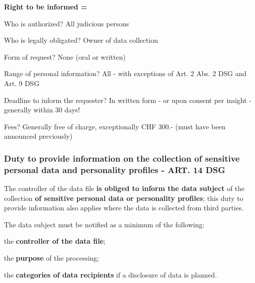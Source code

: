 \textbf{Right to be informed =} 
\begin{compactitem}
	\item Who is authorized? All judicious persons
	\item Who is legally obligated? Owner of data collection
	\item Form of request? None (oral or written)
	\item Range of personal information? All - with exceptions of Art. 2 Abs. 2 DSG and Art. 9 DSG
	\item Deadline to inform the requester? In written form - or upon consent per insight - generally within 30 days!
	\item Fees? Generally free of charge, exceptionally CHF 300.- (must have been announced previously)
\end{compactitem}

\subsubsection{Duty to provide information on the collection of sensitive personal data and personality profiles - ART. 14 DSG}
\begin{compactenum}	
	\item The controller of the data file \textbf{is obliged to inform the data subject} of the collection \textbf{of sensitive personal data or personality profiles}; this duty to provide information also applies where the data is collected from third parties.
	\item The data subject must be notified as a minimum of the following:
	\begin{compactenum}	
		\item the \textbf{controller of the data file};
		\item the \textbf{purpose} of the processing;
		\item the \textbf{categories of data recipients} if a disclosure of data is planned.
	\end{compactenum}
\end{compactenum}

